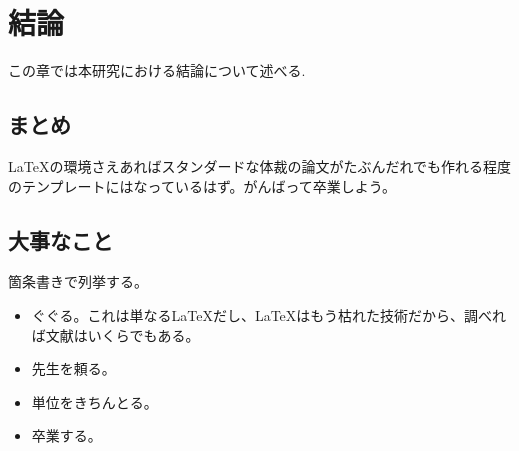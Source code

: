 \chapter{結論}
\label{chap:conclusion}

この章では本研究における結論について述べる.

\section{まとめ}

\LaTeX の環境さえあればスタンダードな体裁の論文がたぶんだれでも作れる程度のテンプレートにはなっているはず。がんばって卒業しよう。


\section{大事なこと}

箇条書きで列挙する。

\begin{itemize}
 \item ぐぐる。これは単なる\LaTeX だし、\LaTeX はもう枯れた技術だから、調べれば文献はいくらでもある。
 \item 先生を頼る。
 \item 単位をきちんとる。
 \item 卒業する。
\end{itemize}
